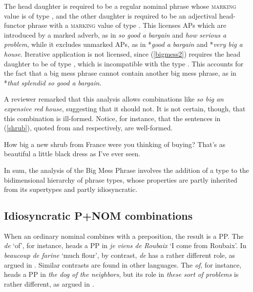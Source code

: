\documentclass[output=paper,biblatex,babelshorthands,newtxmath,draftmode,colorlinks,citecolor=brown]{langscibook}
\begin{document}
\largerpage[2]
\noindent
The head daughter is required to be a regular nominal phrase 
whose \textsc{marking} value is of type , and the other daughter 
is required to be an adjectival head-functor phrase
with a \textsc{marking} value of type . 
This licenses APs which are introduced by a marked adverb, 
as in \emph{so good a bargain} and \emph{how serious a problem}, 
while it excludes unmarked APs, as in 
*\emph{good a bargain} and *\emph{very big a house}.
Iterative application is not licensed, since (\ref{bigmess2}) requires the 
head daughter to be of type , which is incompatible with the type 
. This accounts for the fact that a big
mess phrase cannot contain another big mess phrase, as in
*\emph{that splendid so good a bargain}.

A reviewer remarked that this analysis allows combinations like 
\emph{so big an expensive red house}, suggesting that it should not. 
It is not certain, though, that this combination is ill-formed.
Notice, for instance, that the sentences in (\ref{shrub}), 
quoted from \citet[116]{Zwicky95} and \citet[42]{Troseth09} respectively, 
are well-formed. 

\begin{exe} 
\ex\label{shrub} 
\begin{xlist} 
\ex  How big a new shrub from France were you thinking of buying? 
\ex  That's as beautiful a little black dress as I've ever seen.  
\end{xlist} 
\end{exe} 

In sum, the analysis of the Big Mess Phrase involves the addition of 
a type to the bidimensional hierarchy of phrase types, whose properties 
are partly inherited from its supertypes and partly idiosyncratic.      


\subsection{Idiosyncratic P+NOM combinations} 
\label{prep}


When an ordinary nominal combines with a preposition, the result is a PP. 
The  \emph{de} `of', for instance, heads a PP in 
\emph{je viens de Roubaix} `I come from Roubaix'. 
In \emph{beaucoup de farine} `much flour', by contrast, \emph{de} has 
a rather different role, as argued in \citet{Abeilleetal04}. 
Similar contrasts are found in other languages. The  \emph{of}, for instance, 
heads a PP in \emph{the dog of the neighbors}, but its role in \emph{these sort of problems} 
is rather different, as argued in \citet{Maekawa15}.  
\end{document}
